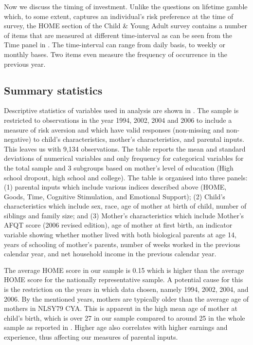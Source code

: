 \documentclass[]{article}
\begin{document}
\alert{Now we discuss the timing of investment. Unlike the questions on lifetime gamble which, to some extent, captures an individual's risk preference at the time of survey, the HOME section of the Child \& Young Adult survey contains a number of items that are measured at different time-interval as can be seen from the Time panel in . The time-interval can range from daily basis, to weekly or monthly bases. Two items even measure the frequency of occurrence in the previous year. }


\subsection{Summary statistics}


Descriptive statistics of variables used in analysis are shown in . The sample is restricted to observations in the year 1994, 2002, 2004 and 2006 to include a measure of risk aversion and which have valid responses (non-missing and non-negative) to child's characteristics, mother's characteristics, and parental inputs. This leaves us with 9,134 observations. The table reports the mean and standard deviations of numerical variables and only frequency for categorical variables for the total sample and 3 subgroups based on mother's level of education (High school dropout, high school and college). The table is organised into three panels: (1) parental inputs which include various indices described above (HOME, Goods, Time, Cognitive Stimulation, and Emotional Support); (2) Child's characteristics which include sex, race, age of mother at birth of child, number of siblings and family size; and (3) Mother's characteristics which include Mother's AFQT score (2006 revised edition), age of mother at first birth, an indicator variable showing whether mother lived with both biological parents at age 14, years of schooling of mother's parents, number of weeks worked in the previous calendar year, and net household income in the previous calendar year.


The average HOME score in our sample is 0.15 which is higher than the average HOME score for the nationally representative sample. A potential cause for this is the restriction on the years in which data chosen, namely 1994, 2002, 2004, and 2006. By the mentioned years, mothers are typically older than the average age of mothers in NLSY79 CYA. This is apparent in the high mean age of mother at child's birth, which is over 27 in our sample compared to around 25 in the whole sample as reported in \citet{carneiro2016partial}. Higher age also correlates with higher earnings and experience, thus affecting our measures of parental inputs. 
\end{document}
